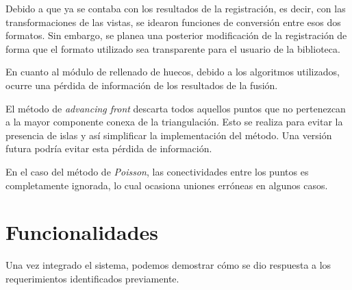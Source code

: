 \documentclass{pfc}
\begin{document}
		Debido a que ya se contaba con los resultados de la registración, es
		decir, con las transformaciones de las vistas, se idearon funciones de
		conversión entre esos dos formatos. %
		Sin embargo, se planea una posterior modificación de la registración de forma que el
		formato utilizado sea transparente para el usuario de la biblioteca.


		En cuanto %
        al módulo de rellenado de huecos, debido a los algoritmos
		utilizados, ocurre una pérdida de información de los resultados de la
		fusión.

		El método de \emph{advancing front} descarta todos aquellos
		puntos que no pertenezcan a la mayor componente conexa de la
		triangulación. Esto se realiza para evitar la presencia de islas y así
		simplificar la implementación del método.
		Una versión futura podría evitar esta pérdida de información.



		En el caso del método de \emph{Poisson}, las conectividades entre los
		puntos es completamente ignorada, lo cual ocasiona uniones erróneas en algunos casos.


	\section{Funcionalidades}
		
        Una vez integrado el sistema, podemos demostrar cómo se dio respuesta a
		los requerimientos identificados previamente. %
\end{document}

